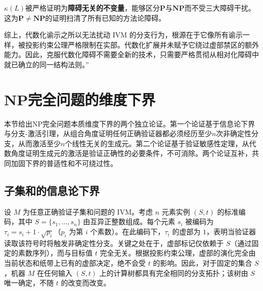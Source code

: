 \documentclass{ctexart}
\begin{document}
	$\kappa(L)$被严格证明为\textbf{障碍无关的不变量}，能够区分$\mathbf{P}$与$\mathbf{NP}$而不受三大障碍干扰。这为$\mathbf{P} \neq \mathbf{NP}$的证明扫清了所有已知的方法论障碍。
	
	
	综上，代数化谕示之所以无法扰动 IVM 的分支行为，根源在于它像所有谕示一样，被投影约束公理严格限制在实部。代数化扩展并未赋予它绕过虚部禁区的额外能力。因此，克服代数化障碍不需要全新的技术，只需要严格贯彻从相对化障碍中就已确立的同一结构法则。”
	
	\section{NP完全问题的维度下界}
	
	本节给出NP完全问题本质维度下界的两个独立论证。第一个论证基于信息论下界与分支-激活引理，从组合角度证明任何正确验证器都必须经历至少$n$次非确定性分支，从而激活至少$n$个线性无关的生成元。第二个论证基于验证敏感性定理，从代数角度证明生成元的激活是验证正确性的必要条件，不可消除。两个论证互补，共同加固下界的普适性和不可绕过性。
	
	\subsection{子集和的信息论下界}
	
	设 $M$ 为任意正确验证子集和问题的 IVM。考虑 $n$ 元素实例 $(S, t)$ 的标准编码，其中 $S = \{s_1, \dots, s_n\}$ 由互异正整数组成。每个元素 $s_i$ 被编码为 $\tau_i = s_i + 1 \cdot \sqrt{p_i}$（$p_i$ 为第 $i$ 个素数）。在此编码下，$\tau_i$ 的虚部为 $1$，表明当验证器读取该符号时将触发非确定性分支。关键之处在于，虚部标记仅依赖于 $S$（通过固定的素数序列），而与目标值 $t$ 完全无关。根据投影约束公理，虚部的演化完全由当前状态和纸带上已有的虚部决定，绝不会受 $t$ 的影响。因此，对于固定的集合 $S$，机器 $M$ 在任何输入 $(S, t)$ 上的计算树都具有完全相同的分支拓扑；该树由 $S$ 唯一确定，不随 $t$ 的改变而改变。
	
\end{document}
